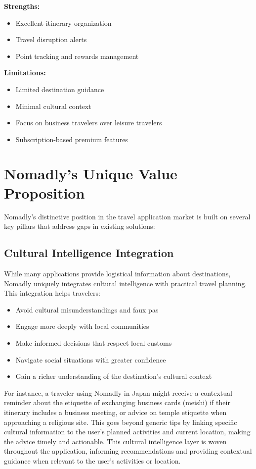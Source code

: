 \documentclass[11pt, a4paper]{article}
\begin{document}
\textbf{Strengths:}
\begin{itemize}
    \item Excellent itinerary organization
    \item Travel disruption alerts
    \item Point tracking and rewards management
\end{itemize}

\textbf{Limitations:}
\begin{itemize}
    \item Limited destination guidance
    \item Minimal cultural context
    \item Focus on business travelers over leisure travelers
    \item Subscription-based premium features
\end{itemize}

\section{Nomadly's Unique Value Proposition}

Nomadly's distinctive position in the travel application market is built on several key pillars that address gaps in existing solutions:

\subsection{Cultural Intelligence Integration}

While many applications provide logistical information about destinations, Nomadly uniquely integrates cultural intelligence with practical travel planning. This integration helps travelers:

\begin{itemize}
    \item Avoid cultural misunderstandings and faux pas
    \item Engage more deeply with local communities
    \item Make informed decisions that respect local customs
    \item Navigate social situations with greater confidence
    \item Gain a richer understanding of the destination's cultural context
\end{itemize}

For instance, a traveler using Nomadly in Japan might receive a contextual reminder about the etiquette of exchanging business cards (meishi) if their itinerary includes a business meeting, or advice on temple etiquette when approaching a religious site. This goes beyond generic tips by linking specific cultural information to the user's planned activities and current location, making the advice timely and actionable. This cultural intelligence layer is woven throughout the application, informing recommendations and providing contextual guidance when relevant to the user's activities or location.
\end{document}
